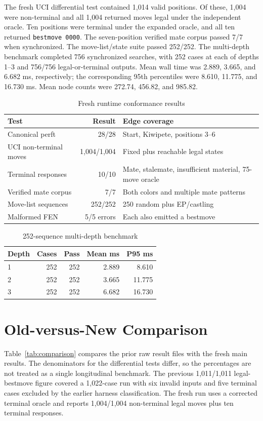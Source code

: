 \documentclass[conference]{IEEEtran}
\begin{document}
The fresh UCI differential test contained 1,014 valid positions. Of these, 1,004 were non-terminal and all 1,004 returned moves legal under the independent oracle. Ten positions were terminal under the expanded oracle, and all ten returned \texttt{bestmove 0000}. The seven-position verified mate corpus passed 7/7 when synchronized. The move-list/state suite passed 252/252. The multi-depth benchmark completed 756 synchronized searches, with 252 cases at each of depths 1--3 and 756/756 legal-or-terminal outputs. Mean wall time was 2.889, 3.665, and 6.682 ms, respectively; the corresponding 95th percentiles were 8.610, 11.775, and 16.730 ms. Mean node counts were 272.74, 456.82, and 985.82.

\begin{table}[t]
\caption{Fresh runtime conformance results}
\label{tab:runtime}
\centering
\begin{tabularx}{\columnwidth}{@{}l r X@{}}
\toprule
Test & Result & Edge coverage \\
\midrule
Canonical perft & 28/28 & Start, Kiwipete, positions 3--6 \\
UCI non-terminal moves & 1,004/1,004 & Fixed plus reachable legal states \\
Terminal responses & 10/10 & Mate, stalemate, insufficient material, 75-move oracle \\
Verified mate corpus & 7/7 & Both colors and multiple mate patterns \\
Move-list sequences & 252/252 & 250 random plus EP/castling \\
Malformed FEN & 5/5 errors & Each also emitted a bestmove \\
\bottomrule
\end{tabularx}
\end{table}

\begin{table}[t]
\caption{252-sequence multi-depth benchmark}
\label{tab:benchmark}
\centering
\begin{tabularx}{\columnwidth}{@{}l r r r r@{}}
\toprule
Depth & Cases & Pass & Mean ms & P95 ms \\
\midrule
1 & 252 & 252 & 2.889 & 8.610 \\
2 & 252 & 252 & 3.665 & 11.775 \\
3 & 252 & 252 & 6.682 & 16.730 \\
\bottomrule
\end{tabularx}
\end{table}

\section{Old-versus-New Comparison}
Table~\ref{tab:comparison} compares the prior raw result files with the fresh main results. The denominators for the differential tests differ, so the percentages are not treated as a single longitudinal benchmark. The previous 1,011/1,011 legal-bestmove figure covered a 1,022-case run with six invalid inputs and five terminal cases excluded by the earlier harness classification. The fresh run uses a corrected terminal oracle and reports 1,004/1,004 non-terminal legal moves plus ten terminal responses.
\end{document}
